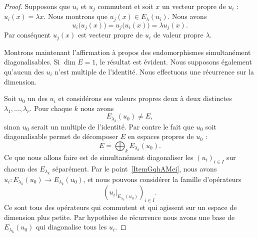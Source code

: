 \begin{proof}
	Supposons que \( u_i\) et \( u_j\) commutent et soit \( x\) un vecteur propre de \( u_i\) : \( u_i(x)=\lambda x\). Nous montrons que \( u_j(x)\in E_{\lambda}(u_i)\). Nous avons
	\begin{equation}
		u_i\big( u_j(x) \big)=u_j\big( u_i(x) \big)=\lambda u_j(x).
	\end{equation}
	Par conséquent \( u_j(x)\) est vecteur propre de \( u_i\) de valeur propre \( \lambda\).

	Montrons maintenant l'affirmation à propos des endomorphismes simultanément diagonalisables. Si \( \dim E=1\), le résultat est évident. Nous supposons également qu'aucun des \( u_i\) n'est multiple de l'identité. Nous effectuons une récurrence sur la dimension.

	Soit \( u_0\) un des \( u_i\) et considérons ses valeurs propres deux à deux distinctes \( \lambda_1,\ldots, \lambda_r\). Pour chaque \( k\) nous avons
	\begin{equation}
		E_{\lambda_k}(u_0)\neq E,
	\end{equation}
	sinon \( u_0\) serait un multiple de l'identité. Par contre le fait que \( u_0\) soit diagonalisable permet de décomposer \( E\) en espaces propres de \( u_0\) :
	\begin{equation}
		E=\bigoplus_{k}E_{\lambda_k}(u_0).
	\end{equation}
	Ce que nous allons faire est de simultanément diagonaliser les \( (u_i)_{i\in I}\) sur chacun des \( E_{\lambda_k}\) séparément. Par le point~\ref{ItemGqhAMei}, nous avons \( u_i\colon E_{\lambda_k}(u_0)\to E_{\lambda_k}(u_0)\), et nous pouvons considérer la famille d'opérateurs
	\begin{equation}
		\left( u_i|_{E_{\lambda_k}(u_0)} \right)_{i\in I}.
	\end{equation}
	Ce sont tous des opérateurs qui commutent et qui agissent sur un espace de dimension plus petite. Par hypothèse de récurrence nous avons une base de \( E_{\lambda_k}(u_0)\) qui diagonalise tous les \( u_i\).
\end{proof}

